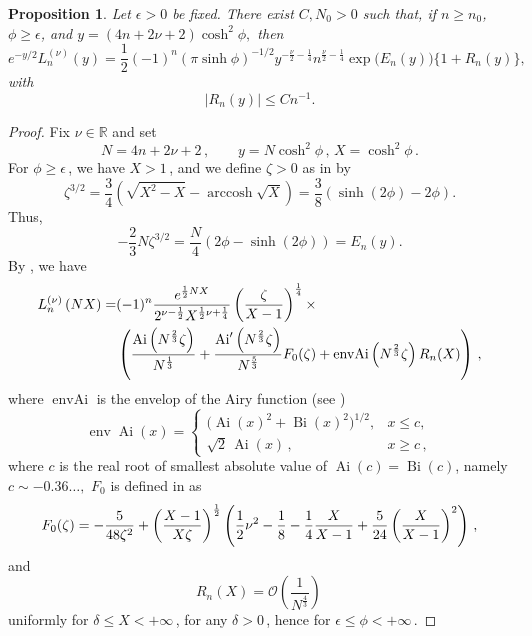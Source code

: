 \documentclass[11pt]{amsart}
\numberwithin{equation}{section}
\newtheorem{proposition}[theorem]{Proposition}
\theoremstyle{remark}
\newcommand{\Ai}{\operatorname{Ai}}
\newcommand{\Bi}{\operatorname{Bi}}
\begin{document}
\begin{proposition}\label{prop:Plancehere-Rotach}
Let $\epsilon>0$ be  fixed. There exist $C,N_0>0$ such that, if $n\geq n_0$, $\phi\geq\epsilon$, and
$y = (4n + 2\nu + 2) \cosh^2 \phi,$ then
\[e^{-y/2} L_n^{(\nu)}(y) = \frac{1}{2} (-1)^n (\pi \sinh \phi)^{-1/2} y^{-\frac{\nu}{2} - \frac{1}{4}} n^{\frac{\nu}{2} - \frac{1}{4}} \exp\bigl(E_n(y)\bigr)\bigl\{ 1 +R_n(y) \bigr\},\]
with
\[|R_n(y)|\leq Cn^{-1}.\]
\end{proposition}
\begin{proof}
Fix $\nu\in\mathbb{R}$ and set
\[
N=4n+2\nu+2\,,
\qquad
y=N\cosh^2\phi\,,\, X=\cosh^2\phi\,.
\]
For $\phi\geq \epsilon\,$, we have $X>1\,$, and we define $\zeta>0$ as in \cite[Eq. (18.15.21)]{DLMF} by
\[
\zeta^{3/2}
=
\frac34\left(
\sqrt{X^2-X}
-
\operatorname{arccosh}\sqrt X
\right)=
\frac38\left(\sinh(2\phi)-2\phi\right).
\]
Thus,
\begin{equation}\label{eq:Nzeta}
-\frac23N\zeta^{3/2}
=
\frac N4\left(2\phi-\sinh(2\phi)\right)=E_n(y).
\end{equation}
By 
\cite[Eq. (18.15.22) for $M=1$]{DLMF},  we have
%
\[
\begin{split}
L^{(\nu)}_{n}\left(N X\right)=&(-1)^{n}\frac{{e}^{\frac{1}{2}N X
}}{2^{\nu-\frac{1}{2}}X^{\frac{1}{2}\nu+\frac{1}{4}}}\*\left(\frac{\zeta
}{X-1}\right)^{\frac{1}{4}}\times\\
&\left(\frac{\operatorname{Ai}\left(N^{\frac{2}{3}
}\zeta\right)}{N^{\frac{1}{3}}}
+\frac{\operatorname{Ai}'\left(N^{\frac{2}{3}}\zeta\right)}{N^{\frac{5}{3}
}}F_{0}(\zeta)+\operatorname{envAi}\left(N^
{\frac{2}{3}}\zeta\right)R_n(X)\right)\,,
\end{split}\]
where $\operatorname{envAi}$ is the envelop of the Airy function (see \cite[Eq. (2.8.20)]{DLMF})
\[ \operatorname{env}\Ai(x)
=\begin{cases}
\bigl(\Ai(x)^2+\Bi(x)^2\bigr)^{1/2},&
x\leq c,\\
\sqrt{2}\,\Ai(x)\,,&
x\geq c\,,
\end{cases}
\]
where $c$ is the real root of smallest absolute value of
$\Ai(c)=\Bi(c)$, namely
$
c\sim -0.36\ldots ,
$
$F_0$ is defined in \cite[Eq. (18.15.23)]{DLMF} as
\[F_0(\zeta)=-\frac{5}{48\zeta^{2}}+\left(\frac{X-1}{X\zeta}\right)^{\frac{1}{%
2}}\left(\frac{1}{2}\nu^{2}-\frac{1}{8}-\frac{1}{4}\frac{X}{X-1}+\frac{5}{2%
4}\left(\frac{X}{X-1}\right)^{2}\right)\,,\]
and
\[R_n(X)=\mathcal O\left(\frac{1}{N^{\frac{4}{3}}}\right)\,\]
uniformly for $\delta\leq X<+\infty\,$, for any $\delta>0\,$, hence for
$\epsilon\leq\phi<+\infty$\,.



\end{proof}
\end{document}
